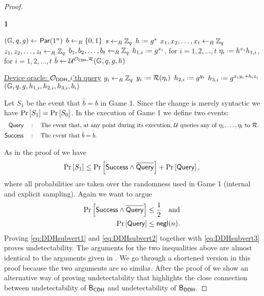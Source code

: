 \begin{proof}
\begin{Algorithm}[]{6cm}
\captionGame
\caption{\textbf{1}}
\begin{algorithmic}[1]
\State $(\mathbb{G},q,g)\leftarrow\operatorname{\mathsf{Par}}(1^n)$
\State $b\leftarrow_R\left\{0,1\right\}$
\State $s\leftarrow_R\mathbb{Z}_q$
\State $h \defeq g^s$
\State $x_1,x_2,\ldots,x_t\leftarrow_R\mathbb{Z}_q$
\State $z_1,z_2,\ldots,z_t\leftarrow_R\mathbb{Z}_q$
\State $b_1,b_2,\ldots,b_t\leftarrow_R\mathbb{Z}_q$
\State $h_{1,i} \defeq g^{x_i}$, for $i = 1, 2, \ldots, t$
\State $\eta_i \defeq h^{x_i}h_{1,i}$, for $i = 1, 2, \ldots, t$
\State $\hat{b}\leftarrow\mathcal{U}^{\operatorname{\mathcal{O}}_{\mathsf{CDH}},\operatorname{\mathcal{R}}}(\mathbb{G},q,g,h)$
\Statex\hrulefill
\end{algorithmic}
\begin{algorithmic}[1]
\Statex \underline{Device oracle: \textbf{$\operatorname{\mathcal{O}}_{\mathsf{DDH}}$} $i$'th query}
\Statex
{}
\State $y_i\leftarrow_R\mathbb{Z}_q$
\Else
\State $y_i \defeq \RO(\eta_i)$
\EndIf
\State $h_{2,i} \defeq g^{y_i}$
\State $h_{3,i} \defeq g^{x_iy_i+b_iz_i}$
\State \Ret $(\mathbb{G},q,g,h_{1,i},h_{2,i},h_{3,i},b_i)$
\end{algorithmic}
\end{Algorithm}

Let $S_1$ be the event that $\hat{b} = b$ in Game 1. Since the change is merely syntactic we have $\operatorname{Pr}\left[{S_1}\right] = \operatorname{Pr}\left[{S_0}\right]$. In the execution of Game 1 we define two events:
\begin{align*}
	\mathsf{Query}\quad &: \quad \mbox{The event that, at any point during its execution, $\mathcal{U}$ queries any of $\eta_1,\ldots,\eta_t$ to $\operatorname{\mathcal{R}}$.} \\
	\mathsf{Success}\quad &: \quad \mbox{The event that $\hat{b} = b$.} 
\end{align*}

As in the proof of  we have
\begin{align}
\label{eq:DDHsubvert3}
	\operatorname{Pr}\left[{S_1}\right] \leq \operatorname{Pr}\left[{\mathsf{Success}\wedge\overline{\mathstrut\mathsf{Query}}}\right]+\operatorname{Pr}\left[{\mathsf{Query}}\right],
\end{align}
where all probabilities are taken over the randomness used in Game 1 (internal and explicit sampling). Again we want to argue
\begin{align}
	\label{eq:DDHsubvert1} \operatorname{Pr}\left[{\mathsf{Success}\wedge\overline{\mathstrut\mathsf{Query}}}\right] &\leq \frac{1}{2}\quad\mbox{and} \\
	\label{eq:DDHsubvert2} \operatorname{Pr}\left[{\mathsf{Query}}\right] &\leq \operatorname{\mathsf{negl}}(n). 
\end{align}
Proving \ref{eq:DDHsubvert1} and \ref{eq:DDHsubvert2} together with \ref{eq:DDHsubvert3} proves undetectability. The arguments for the two inequalities above are almost identical to the arguments given in . We go through a shortened version in this proof because the two arguments are so similar. After the proof of  we show an alternative way of proving undetectability that highlights the close connection between undetectability of $\mathsf{B}_{\mathsf{CDH}}$ and undetectability of $\mathsf{B}_{\mathsf{DDH}}$. 


\end{proof}
